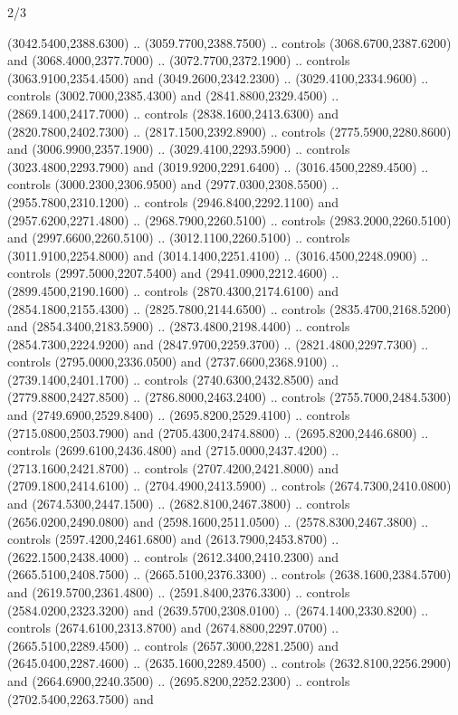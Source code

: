 \begin{flagdescription}{2/3}
\begin{scope}[shift={(0.5\flaglength,0.5)},scale=\flagwidth/130]
\begin{scope}[y=0.01mm, x=0.01mm,shift={(-3365,-2250)}]
  (3042.5400,2388.6300) .. (3059.7700,2388.7500) .. controls
  (3068.6700,2387.6200) and (3068.4000,2377.7000) .. (3072.7700,2372.1900) ..
  controls (3063.9100,2354.4500) and (3049.2600,2342.2300) ..
  (3029.4100,2334.9600) .. controls (3002.7000,2385.4300) and
  (2841.8800,2329.4500) .. (2869.1400,2417.7000) .. controls
  (2838.1600,2413.6300) and (2820.7800,2402.7300) .. (2817.1500,2392.8900) ..
  controls (2775.5900,2280.8600) and (3006.9900,2357.1900) ..
  (3029.4100,2293.5900) .. controls (3023.4800,2293.7900) and
  (3019.9200,2291.6400) .. (3016.4500,2289.4500) .. controls
  (3000.2300,2306.9500) and (2977.0300,2308.5500) .. (2955.7800,2310.1200) ..
  controls (2946.8400,2292.1100) and (2957.6200,2271.4800) ..
  (2968.7900,2260.5100) .. controls (2983.2000,2260.5100) and
  (2997.6600,2260.5100) .. (3012.1100,2260.5100) .. controls
  (3011.9100,2254.8000) and (3014.1400,2251.4100) .. (3016.4500,2248.0900) ..
  controls (2997.5000,2207.5400) and (2941.0900,2212.4600) ..
  (2899.4500,2190.1600) .. controls (2870.4300,2174.6100) and
  (2854.1800,2155.4300) .. (2825.7800,2144.6500) .. controls
  (2835.4700,2168.5200) and (2854.3400,2183.5900) .. (2873.4800,2198.4400) ..
  controls (2854.7300,2224.9200) and (2847.9700,2259.3700) ..
  (2821.4800,2297.7300) .. controls (2795.0000,2336.0500) and
  (2737.6600,2368.9100) .. (2739.1400,2401.1700) .. controls
  (2740.6300,2432.8500) and (2779.8800,2427.8500) .. (2786.8000,2463.2400) ..
  controls (2755.7000,2484.5300) and (2749.6900,2529.8400) ..
  (2695.8200,2529.4100) .. controls (2715.0800,2503.7900) and
  (2705.4300,2474.8800) .. (2695.8200,2446.6800) .. controls
  (2699.6100,2436.4800) and (2715.0000,2437.4200) .. (2713.1600,2421.8700) ..
  controls (2707.4200,2421.8000) and (2709.1800,2414.6100) ..
  (2704.4900,2413.5900) .. controls (2674.7300,2410.0800) and
  (2674.5300,2447.1500) .. (2682.8100,2467.3800) .. controls
  (2656.0200,2490.0800) and (2598.1600,2511.0500) .. (2578.8300,2467.3800) ..
  controls (2597.4200,2461.6800) and (2613.7900,2453.8700) ..
  (2622.1500,2438.4000) .. controls (2612.3400,2410.2300) and
  (2665.5100,2408.7500) .. (2665.5100,2376.3300) .. controls
  (2638.1600,2384.5700) and (2619.5700,2361.4800) .. (2591.8400,2376.3300) ..
  controls (2584.0200,2323.3200) and (2639.5700,2308.0100) ..
  (2674.1400,2330.8200) .. controls (2674.6100,2313.8700) and
  (2674.8800,2297.0700) .. (2665.5100,2289.4500) .. controls
  (2657.3000,2281.2500) and (2645.0400,2287.4600) .. (2635.1600,2289.4500) ..
  controls (2632.8100,2256.2900) and (2664.6900,2240.3500) ..
  (2695.8200,2252.2300) .. controls (2702.5400,2263.7500) and

\end{scope}
\end{scope}
\end{flagdescription}

